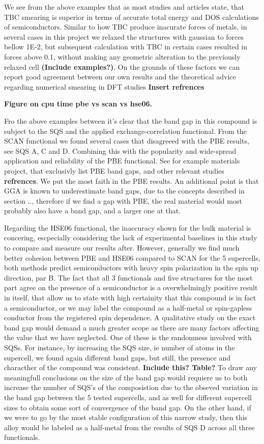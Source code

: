 We see from the above examples that as most studies and articles state, that TBC smearing is superior in terms of accurate total energy and DOS calculations of semiconductors. Similar to how TBC produce inacurate forces of metals, in several cases in this project we relaxed the structures with gaussian to forces bellow 1E-2, but subsequent calculation with TBC in certain cases resulted in forces above 0.1, without making any geometric alteration to the previously relaxed cell \textbf{(Include examples?)}. On the grounds of these factors we can report good agreement between our own results and the theoretical advice regarding numerical smearing in DFT studies \textbf{Insert refrences}

\textbf{Figure on cpu time pbe vs scan vs hse06.}

Fro the above examples between it's clear that the band gap in this compound is subject to the SQS and the applied exchange-correlation functional. From the SCAN functional we found several cases that disagreeed with the PBE results, see SQS A, C and D. Combining this with the popularity and wide-spread application and reliability of the PBE functional. See for example materials project, that exclusivly list PBE band gaps, and other relevant studies \textbf{refrences}. We put the most faith in the PBE results. An additional point is that GGA is known to underestimate band gaps, due to the concepts described in section .., therefore if we find a gap with PBE, the real material would most probably also have a band gap, and a larger one at that.

Regarding the HSE06 functional, the inaccuracy shown for the bulk material is concering, escpecially considering the lack of experimental baselines in this study to compare and measure our results after. However, generally we find much better cohesion between PBE and HSE06 compared to SCAN for the 5 supercells, both methods predict semiconductors with heavy spin polarization in the spin up direction, par B. The fact that all 3 functionals and five structures for the most part agree on the presence of a semiconductor is a overwhelmingly positive result in itself, that allow us to state with high certainity that this compound is in fact a semiconductor, or we may label the compound as a half-metal or spin-gapless conductor from the registered spin dependence. A qualitative study on the exact band gap would demand a much greater scope as there are many factors affecting the value that we have neglected. One of these is the randomness involved with SQSs. For instance, by increasing the SQS size, ie number of atoms in the supercell, we found again different band gaps, but still, the presence and characther of the compound was consistent. \textbf{Include this? Table?} To draw any meaningfull conclusions on the size of the band gap would requiere us to both increase the number of SQS's of the composistion due to the obseved variation in the band gap between the 5 tested supercells, and as well for different supercell sizes to obtain some sort of convergence of the band gap. On the other hand, if we were to go by the most stable configuration of this narrow study, then this alloy would be labeled as a half-metal from the results of SQS D across all three functionals.  

